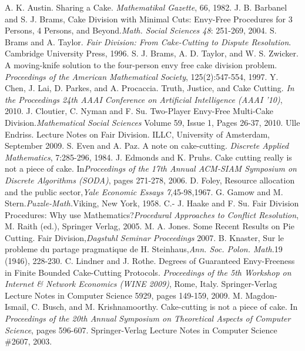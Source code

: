 \documentclass[11pt, a4paper, twoside]{article}
\numberwithin{equation}{section}
\begin{document}
\begin{thebibliography}{9}
 A. K. Austin. Sharing a Cake. \emph{Mathematikal Gazette}, 66, 1982.
 J. B. Barbanel and S. J. Brams, Cake Division with Minimal Cuts: Envy-Free Procedures for 3 Persons, 4 Persons, and Beyond.\emph{Math. Social Sciences 48}: 251-269, 2004.
 S. Brams and A. Taylor. \emph{Fair Division: From Cake-Cutting to Dispute Resolution}. Cambridge University Press, 1996.
 S. J. Brams, A. D. Taylor, and W. S.
Zwicker. A moving-knife solution to the four-person envy
free cake division problem. \emph{Proceedings of the American
Mathematical Society}, 125(2):547-554, 1997.
 Y. Chen, J. Lai, D. Parkes, and A. Procaccia. Truth, Justice, and Cake Cutting. \emph{In the Proceedings 24th AAAI Conference on Artificial Intelligence (AAAI '10)}, 2010.
 J. Cloutier, C. Nyman and F. Su. Two-Player Envy-Free Multi-Cake Division.\emph{Mathematical Social Sciences}
Volume 59, Issue 1, Pages 26-37, 2010. 
 Ulle Endriss. Lecture Notes on Fair Division. ILLC, University of Amsterdam, September 2009.
 S. Even and A. Paz. A note on cake-cutting. \emph{Discrete Applied Mathematics}, 7:285-296, 1984.
 J. Edmonds and K. Pruhs. Cake
cutting really is not a piece of cake. In\emph{Proceedings of
the 17th Annual ACM-SIAM Symposium on Discrete Algorithms (SODA)}, pages 271-278, 2006.
 D. Foley, Resource allocation and the public sector,\emph{Yale Economic Essays 7},45-98,1967.
 G. Gamow and M. Stern.\emph{Puzzle-Math.}Viking, New York, 1958.
 C.- J. Haake and F. Su. Fair Division Procedures: Why use Mathematics?\emph{Procedural Approaches to Conflict Resolution}, M. Raith (ed.), Springer Verlag, 2005.
 M. A. Jones. Some Recent Results on Pie Cutting. Fair Division,\emph{Dagstuhl Seminar Proceedings} 2007.
 B.  Knaster,  Sur  le  probleme  du  partage  pragmatique  de  H.  Steinhaus,\emph{Ann.  Soc.  Polon.  Math.}19 (1946), 228-230. 
 C. Lindner and J. Rothe. Degrees of Guaranteed Envy-Freeness in Finite Bounded Cake-Cutting Protocols. \emph{Proceedings of the 5th Workshop on Internet \& Network Economics (WINE 2009)}, Rome, Italy. Springer-Verlag Lecture Notes in Computer Science 5929, pages 149-159, 2009.
 M. Magdon-Ismail, C. Busch, and M. Krishnamoorthy. Cake-cutting is not a piece of cake. In \emph{Proceedings of the 20th Annual Symposium on Theoretical Aspects of Computer Science}, pages 596-607. Springer-Verlag Lecture Notes in Computer Science \#2607, 2003.

\end{thebibliography}
\end{document}
